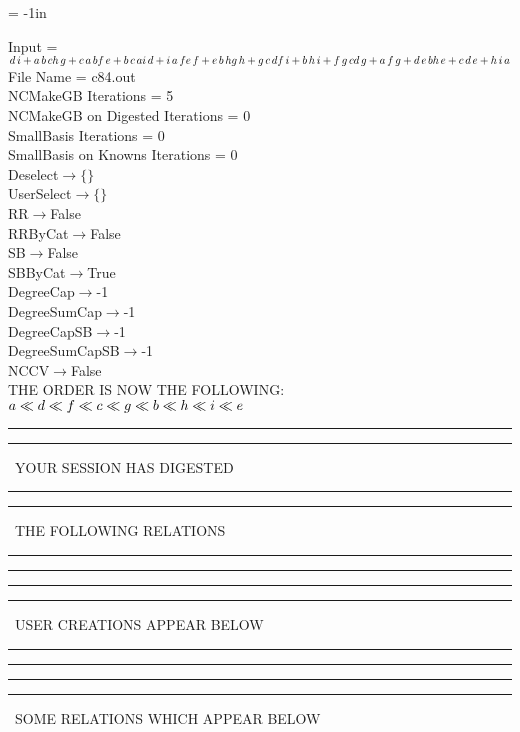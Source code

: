 \voffset = -1in
\evensidemargin 0.1in
\oddsidemargin 0.1in
\textheight 9in
\textwidth 6in

\normalsize
\baselineskip=12pt
\noindent
Input = 
$
\\d\,
 i + a\,
 b\,
 c\\
h\,
 g + c\,
 a\,
 b\\
f\,
 e + b\,
 c\,
 a\\
i\,
 d + i\,
 a\,
 f\\
e\,
 f + e\,
 b\,
 h\\
g\,
 h + g\,
 c\,
 d\\
f\,
 i + b\,
 h\,
 i + f\,
 g\,
 c\\
d\,
 g + a\,
 f\,
 g + d\,
 e\,
 b\\
h\,
 e + c\,
 d\,
 e + h\,
 i\,
 a\\
$
File Name = c84.out\\
NCMakeGB Iterations = 5\\
NCMakeGB on Digested Iterations = 0\\
SmallBasis Iterations = 0\\
SmallBasis on Knowns Iterations = 0\\
Deselect$\rightarrow \{\}$\\
UserSelect$\rightarrow \{\}$\\
RR$\rightarrow $False\\
RRByCat$\rightarrow $False\\
SB$\rightarrow $False\\
SBByCat$\rightarrow $True\\
DegreeCap$\rightarrow $-1\\
DegreeSumCap$\rightarrow $-1\\
DegreeCapSB$\rightarrow $-1\\
DegreeSumCapSB$\rightarrow $-1\\
NCCV$\rightarrow $False\\
THE ORDER IS NOW THE FOLLOWING:\hfil\break
$
a\ll
d\ll
f\ll
c\ll
g\ll
b\ll
h\ll
i\ll
e\\
$
\rule[2pt]{6in}{4pt}\hfil\break
\rule[2pt]{1.879in}{4pt}
\ YOUR SESSION HAS DIGESTED\ 
\rule[2pt]{1.879in}{4pt}\hfil\break
\rule[2pt]{1.923in}{4pt}
\ THE FOLLOWING RELATIONS\ 
\rule[2pt]{1.923in}{4pt}\hfil\break
\rule[2pt]{6in}{4pt}\hfil\break
\rule[2pt]{6in}{1pt}\hfil\break
\rule[2.5pt]{1.701in}{1pt}
\ USER CREATIONS APPEAR BELOW\ 
\rule[2.5pt]{1.701in}{1pt}\hfil\break
\rule[2pt]{6in}{1pt}\hfil\break
\rule[2pt]{6in}{4pt}\hfil\break
\rule[2pt]{1.45in}{4pt}
\ SOME RELATIONS WHICH APPEAR BELOW\ 
